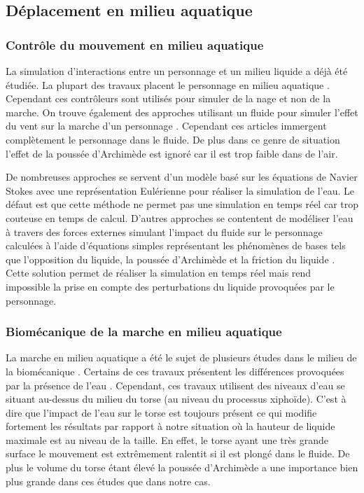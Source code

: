 \documentclass[runningheads,a4paper]{llncs}
\begin{document}
\subsection{Déplacement en milieu aquatique}
\subsubsection{Contrôle du mouvement en milieu aquatique}
La simulation d'interactions entre un personnage et un milieu liquide a déjà été étudiée. La plupart des travaux placent le personnage en milieu aquatique \cite{yang2004layered,kwatra2010fluid,tan2011articulated,si2014realistic}. Cependant ces contrôleurs sont utilisés pour simuler de la nage et non de la marche. On trouve également des approches utilisant un fluide pour simuler l'effet du vent sur la marche d'un personnage \cite{lentine2011creature}. Cependant ces articles immergent complètement le personnage dans le fluide. De plus dans ce genre de situation l'effet de la poussée d'Archimède est ignoré car il est trop faible dans de l'air.

De nombreuses approches se servent d'un modèle basé sur les équations de Navier Stokes \cite{stam1999stable} avec une représentation Eulérienne \cite{si2014realistic} pour réaliser la simulation de l'eau. Le défaut est que cette méthode ne permet pas une simulation en temps réel car trop couteuse en temps de calcul. D'autres approches se contentent de modéliser l'eau à travers des forces externes simulant l'impact du fluide sur le personnage calculées à l'aide d'équations simples représentant les phénomènes de bases tels que l'opposition du liquide, la poussée d'Archimède et la friction du liquide \cite{yang2004layered}. Cette solution permet de réaliser la simulation en temps réel mais rend impossible la prise en compte des perturbations du liquide provoquées par le personnage.

\subsubsection{Biomécanique de la marche en milieu aquatique}
La marche en milieu aquatique a été le sujet de plusieurs études dans le milieu de la biomécanique \cite{barela2006biomechanical,chevutschi2009comparison,orselli2011joint,miyoshi2005functional}. Certains de ces travaux présentent les différences provoquées par la présence de l'eau \cite{barela2006biomechanical}. Cependant, ces travaux utilisent des niveaux d'eau se situant au-dessus du milieu du torse (au niveau du processus xiphoïde). C’est à dire que l'impact de l'eau sur le torse est toujours présent ce qui modifie fortement les résultats par rapport à notre situation où la hauteur de liquide maximale est au niveau de la taille. En effet, le torse ayant une très grande surface le mouvement est extrêmement ralentit si il est plongé dans le fluide. De plus le volume du torse étant élevé la poussée d'Archimède a une importance bien plus grande dans ces études que dans notre cas. 
\end{document}
